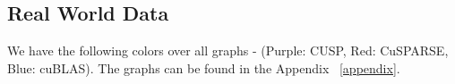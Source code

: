 \documentclass[12pt]{article}
\begin{document}
\subsection{Real World Data}
We have the following colors over all graphs -  
(Purple: CUSP, Red: CuSPARSE, Blue: cuBLAS). The graphs can be found in the Appendix ~\ref{appendix}.

\end{document}
